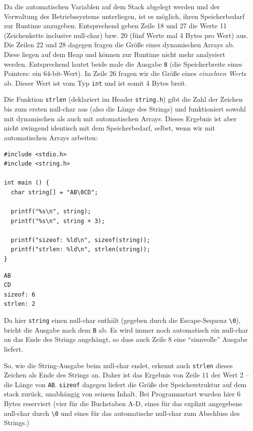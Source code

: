 Da die automatischen Variablen auf dem Stack abgelegt werden und der Verwaltung des Betriebssystems unterliegen, ist es möglich, ihren Speicherbedarf zur Runtime anzugeben. Entsprechend geben Zeile 18 und 27 die Werte 11 (Zeichenkette inclusive null-char) bzw. 20 (fünf Werte mal 4 Bytes pro Wert) aus. Die Zeilen 22 und 28 dagegen fragen die Größe eines dynamischen Arrays ab. Diese liegen auf dem Heap und können zur Runtime nicht mehr analysiert werden. Entsprechend lautet beide male die Ausgabe \texttt{8} (die Speicherbreite eines Pointers: ein 64-bit-Wert). In Zeile 26 fragen wir die Größe eines \emph{einzelnen Werts} ab. Dieser Wert ist vom Typ \texttt{int} und ist somit 4 Bytes breit.

Die Funktion \texttt{strlen} (deklariert im Header \texttt{string.h}) gibt die Zahl der Zeichen bis zum ersten null-char aus (also die Länge des Strings) und funktioniert sowohl mit dynamischen als auch mit automatischen Arrays. Dieses Ergebnis ist aber nicht zwingend identisch mit dem Speicherbedarf, selbst, wenn wir mit automatischen Arrays arbeiten:

\begin{codebox}
\begin{verbatim}
#include <stdio.h>
#include <string.h>

int main () {
  char string[] = "AB\0CD";
  
  printf("%s\n", string);
  printf("%s\n", string + 3);
  
  printf("sizeof: %ld\n", sizeof(string));
  printf("strlen: %ld\n", strlen(string));
}
\end{verbatim}
\end{codebox}

\begin{cmdbox}
\begin{verbatim}
AB
CD
sizeof: 6
strlen: 2
\end{verbatim}
\end{cmdbox}

Da hier \texttt{string} einen null-char enthält (gegeben durch die Escape-Sequenz \texttt{\textbackslash 0}), bricht die Ausgabe nach dem \texttt{B} ab. Es wird immer noch automatisch ein null-char an das Ende des Strings angehängt, so dass auch Zeile 8 eine \enquote{sinnvolle} Ausgabe liefert.

So, wie die String-Ausgabe beim null-char endet, erkennt auch \texttt{strlen} dieses Zeichen als Ende des Strings an. Daher ist das Ergebnis von Zeile 11 der Wert 2 -- die Länge von \texttt{AB}. \texttt{sizeof} dagegen liefert die Größe der Speicherstruktur auf dem stack zurück, unabhängig von seinem Inhalt. Bei Programmstart wurden hier 6 Bytes reserviert (vier für die Buchstaben A-D, eines für das explizit angegebene null-char durch \texttt{\textbackslash 0} und eines für das automatische null-char zum Abschluss des Strings.)

